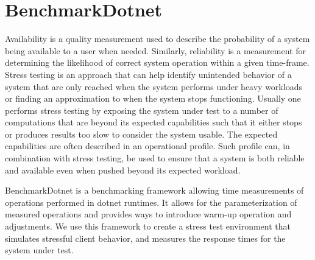 \section*{BenchmarkDotnet}
Availability is a quality measurement used to describe the probability of a system being available to a user when needed. Similarly, reliability is a measurement for determining the likelihood of correct system operation within a given time-frame. \cite{reliabilityAvailability}
Stress testing is an approach that can help identify unintended behavior of a system that are only reached when the system performs under heavy workloads or finding an approximation to when the system stops functioning.
Usually one performs stress testing by exposing the system under test to a number of computations that are beyond its expected capabilities such that it either stops or produces results too slow to consider the system usable\cite{Sommerville10}.
The expected capabilities are often described in an operational profile\cite{OperationalProfiles}.
Such profile can, in combination with stress testing, be used to ensure that a system is both reliable and available even when pushed beyond its expected workload.

BenchmarkDotnet\cite{Benchmarkdotnet} is a benchmarking framework allowing time measurements of operations performed in dotnet runtimes.
It allows for the parameterization of measured operations and provides ways to introduce warm-up operation and adjustments.
We use this framework to create a stress test environment that simulates stressful client behavior, and measures the response times for the system under test.
